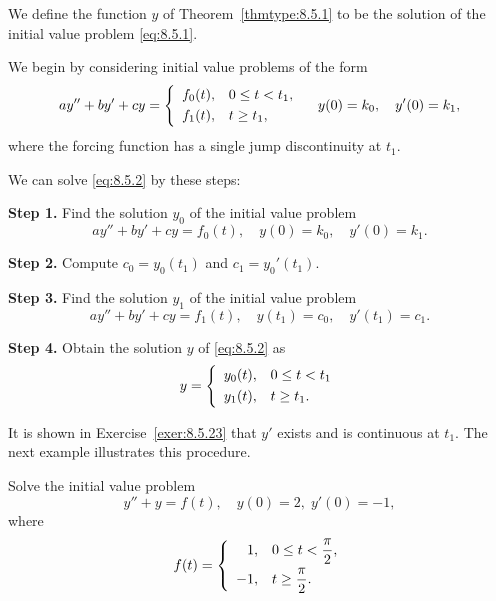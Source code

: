 We define the function $y$ of Theorem~\ref{thmtype:8.5.1} to be the solution of the initial value
problem \eqref{eq:8.5.1}.

We begin by considering initial value problems of the form
\begin{equation}
  \label{eq:8.5.2}ay''+by'+cy=\left\{
  \begin{array}{cl}
    f_{0}(t), & 0\le t<t_{1}, \\[1\jot]
    f_{1}(t), & t\ge t_{1},
  \end{array}\right.\quad y(0)=k_{0},\quad y'(0)=k_{1},
\end{equation}
where the forcing function has a single jump discontinuity at $t_{1}$.

We can solve \eqref{eq:8.5.2} by these steps:
\begin{description}
  \item {\bf Step 1.} Find the solution $y_{0}$ of the initial value problem
    \[
      ay''+by'+cy=f_{0}(t),\quad y(0)=k_{0},\quad y'(0)=k_{1}.
    \]

  \item {\bf Step 2.} Compute $c_{0}=y_{0}(t_{1})$ and $c_{1}=y_{0}'(t_{1})$.

  \item {\bf Step 3.} Find the solution $y_{1}$ of the initial value problem
    \[
      ay''+by'+cy=f_{1}(t),\quad y(t_{1})=c_{0},\quad y'(t_{1})=c_{1}.
    \]

  \item {\bf Step 4.} Obtain the solution $y$ of \eqref{eq:8.5.2} as
    \[
      y=\left\{
      \begin{array}{cl}
        y_{0}(t), & 0\le t<t_{1} \\[1\jot]
        y_{1}(t), & t\ge t_{1}.
      \end{array}\right.
    \]
\end{description}

It is shown in Exercise~\ref{exer:8.5.23} that $y'$ exists and is continuous at $t_{1}$. The next
example illustrates this procedure.

\begin{example}
  \label{example:8.5.1}\rm Solve the initial value problem
  \begin{equation}
    \label{eq:8.5.3}y''+y=f(t), \quad y(0)=2,\;y'(0)=-1,
  \end{equation}
  where
  \[
    f(t)=\left\{
    \begin{array}{rl}
      1,  & 0\le t<\displaystyle\frac{\pi}{2}, \\[2\jot]
      -1, & t\ge\displaystyle{\frac{\pi}{2}}.
    \end{array}\right.
  \]
\end{example}

